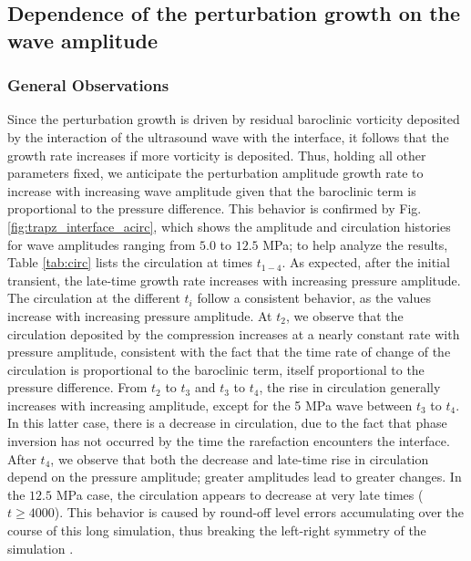 \documentclass{jfm}%
\begin{document}
%
%


\subsection{Dependence of the perturbation growth on the wave amplitude}
\label{subsec:amp_dependence}%
\subsubsection{General Observations}
\label{subsubsec:general_observations}
Since the perturbation growth is driven by residual baroclinic
vorticity deposited by the interaction of the ultrasound wave with the
interface, it follows that the growth rate increases if more vorticity
is deposited. Thus, holding all other parameters fixed, we anticipate
the perturbation amplitude growth rate to increase with increasing
wave amplitude given that the baroclinic term is proportional to the
pressure difference. This behavior is confirmed by Fig.
\ref{fig:trapz_interface_acirc}, which shows the amplitude and
circulation histories for wave amplitudes ranging from $5.0$ to $12.5$
MPa; to help analyze the results, Table \ref{tab:circ} lists the
circulation at times $t_{1-4}$.  As expected, after the initial
transient, the late-time growth rate increases with increasing
pressure amplitude.  The circulation at the different $t_i$ follow a
consistent behavior, as the values increase with increasing pressure
amplitude. At $t_2$, we observe that the circulation deposited by the
compression increases at a nearly constant rate with pressure
amplitude, consistent with the fact that the time rate of change of
the circulation is proportional to the baroclinic term, itself
proportional to the pressure difference. From $t_2$ to $t_3$ and $t_3$
to $t_4$, the rise in circulation generally increases with increasing
amplitude, except for the 5 MPa wave between $t_3$ to $t_4$. In this
latter case, there is a decrease in circulation, due to the fact that
phase inversion has not occurred by the time the rarefaction
encounters the interface.  After $t_4$, we observe that both the
decrease and late-time rise in circulation depend on the pressure
amplitude; greater amplitudes lead to greater changes.  In the $12.5$
MPa case, the circulation appears to decrease at very late times
($t\geq4000$). This behavior is caused by round-off level errors
accumulating over the course of this long simulation, thus breaking
the left-right symmetry of the simulation \citep{Movahed2013}.
\end{document}

